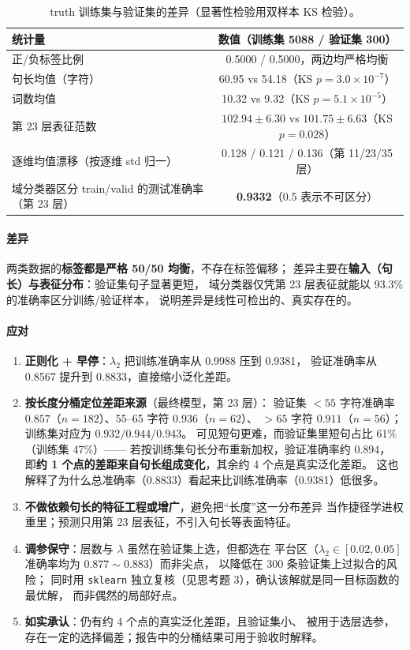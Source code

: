\documentclass[UTF8,a4paper]{ctexart}
\begin{document}
\begin{table}[htbp]
\centering
\caption{truth 训练集与验证集的差异（显著性检验用双样本 KS 检验）。}
\label{tab:shift}
\small
\begin{tabular}{lc}
\toprule
统计量 & 数值（训练集 5088 / 验证集 300） \\
\midrule
正/负标签比例 & 0.5000 / 0.5000，两边均严格均衡 \\
句长均值（字符） & 60.95 vs 54.18（KS $p=3.0\times10^{-7}$） \\
词数均值 & 10.32 vs 9.32（KS $p=5.1\times10^{-5}$） \\
第 23 层表征范数 & $102.94\pm6.30$ vs $101.75\pm6.63$（KS $p=0.028$） \\
逐维均值漂移（按逐维 std 归一） & 0.128 / 0.121 / 0.136（第 11/23/35 层） \\
域分类器区分 train/valid 的测试准确率（第 23 层） & \textbf{0.9332}（0.5 表示不可区分） \\
\bottomrule
\end{tabular}
\end{table}

\paragraph{差异}两类数据的\textbf{标签都是严格 50/50 均衡}，不存在标签偏移；
差异主要在\textbf{输入（句长）与表征分布}：验证集句子显著更短，
域分类器仅凭第 23 层表征就能以 93.3\% 的准确率区分训练/验证样本，
说明差异是线性可检出的、真实存在的。

\paragraph{应对}
\begin{enumerate}
  \item \textbf{正则化 + 早停}：$\lambda_2$ 把训练准确率从 0.9988 压到 0.9381，
  验证准确率从 0.8567 提升到 0.8833，直接缩小泛化差距。
  \item \textbf{按长度分桶定位差距来源}（最终模型，第 23 层）：
  验证集 $<55$ 字符准确率 $0.857$（$n=182$）、55--65 字符 $0.936$（$n=62$）、
  $>65$ 字符 $0.911$（$n=56$）；训练集对应为 $0.932/0.944/0.943$。
  可见短句更难，而验证集里短句占比 61\%（训练集 47\%）——
  若按训练集句长分布重新加权，验证准确率约 $0.894$，
  即\textbf{约 1 个点的差距来自句长组成变化}，其余约 4 个点是真实泛化差距。
  这也解释了为什么总准确率（0.8833）看起来比训练准确率（0.9381）低很多。
  \item \textbf{不做依赖句长的特征工程或增广}，避免把“长度”这一分布差异
  当作捷径学进权重里；预测只用第 23 层表征，不引入句长等表面特征。
  \item \textbf{调参保守}：层数与 $\lambda$ 虽然在验证集上选，但都选在
  平台区（$\lambda_2\in[0.02,0.05]$ 准确率均为 $0.877\sim0.883$）而非尖点，
  以降低在 300 条验证集上过拟合的风险；
  同时用 \texttt{sklearn} 独立复核（见思考题 3），确认该解就是同一目标函数的最优解，
  而非偶然的局部好点。
  \item \textbf{如实承认}：仍有约 4 个点的真实泛化差距，且验证集小、
  被用于选层选参，存在一定的选择偏差；报告中的分桶结果可用于验收时解释。
\end{enumerate}
\end{document}
